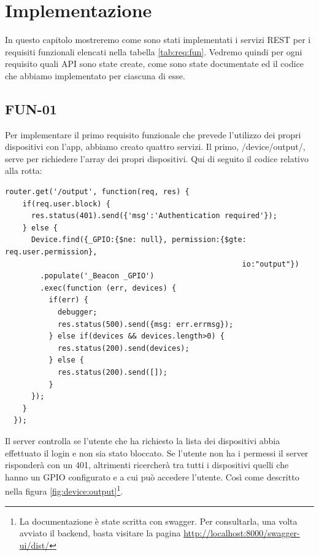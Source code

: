 \chapter{Implementazione}
In questo capitolo mostreremo come sono stati implementati i servizi REST per i requisiti funzionali elencati nella tabella \ref{tab:req:fun}.
Vedremo quindi per ogni requisito quali API sono state create, come sono state documentate ed il codice che abbiamo implementato per ciascuna di esse.

\section{FUN-01}
Per implementare il primo requisito funzionale che prevede l'utilizzo dei propri dispositivi con l'app, abbiamo creato quattro servizi.
Il primo, /device/output/, serve per richiedere l'array dei propri dispositivi.
Qui di seguito il codice relativo alla rotta:
\begin{lstlisting}[caption={/webserver/app/routes/device.js output}, style=javaScriptCode]
  router.get('/output', function(req, res) {
    if(req.user.block) {
      res.status(401).send({'msg':'Authentication required'});
    } else {
      Device.find({_GPIO:{$ne: null}, permission:{$gte: req.user.permission}, 
                                                      io:"output"})
        .populate('_Beacon _GPIO')
        .exec(function (err, devices) {
          if(err) {
            debugger;
            res.status(500).send({msg: err.errmsg});
          } else if(devices && devices.length>0) {
            res.status(200).send(devices);
          } else {
            res.status(200).send([]);
          }
      });
    }
  });
\end{lstlisting}
Il server controlla se l'utente che ha richiesto la lista dei dispositivi abbia effettuato il login e non sia stato bloccato.
Se l'utente non ha i permessi il server risponderà con un 401, altrimenti ricercherà tra tutti i dispositivi quelli che hanno un GPIO configurato e a cui può accedere l'utente. 
Così come descritto nella figura \ref{fig:device:output}\footnote{La documentazione è state scritta con swagger. Per consultarla, una volta avviato il backend, basta visitare la pagina \url{http://localhost:8000/swagger-ui/dist/} }. 

